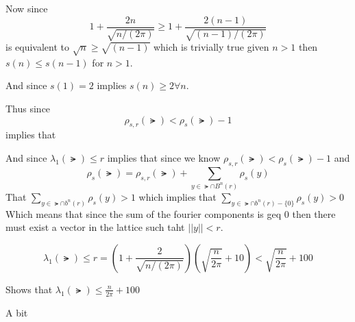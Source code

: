 \documentclass[12pt]{amsart}
\begin{document}
\begin{problem}
\begin{subproblem}
    Now since 
    \[1+\frac {2n}{\sqrt{n/(2\pi)}} \geq 1+\frac {2(n-1)}{\sqrt{(n-1)/(2\pi)}}\]
    is equivalent to $\sqrt n \geq \sqrt{(n-1)}$ which is trivially true given $n>1$ then $s(n) \leq s(n-1)$ for $n>1$.

    And since $s(1)=2$ implies $s(n)\geq 2\forall n$.


    Thus since 
    \[\rho_{s,r}(\lat) < \rho_s(\lat)-1\]
    implies that 

    And since $\lambda_1(\lat)\leq r$ implies that since we know 
    $\rho_{s,r}(\lat) < \rho_s(\lat)-1$ and 
    \[\rho_s(\lat) = \rho_{s,r}(\lat) + \sum_{y\in \lat \cap B^n(r)}\rho_s(y)\]
    That $\sum_{y\in \lat \cap b^n(r)}\rho_s(y) > 1$ which implies that $\sum_{y\in \lat \cap b^n(r)-\{0\}}\rho_s(y) > 0$
    Which means that since the sum of the fourier components is geq 0 then there must exist a vector in the lattice such taht $||y||<r$.

    \[\lambda_1(\lat) \leq r = (1+\frac2{\sqrt{n/(2\pi)}})(\sqrt{\frac{n}{2\pi}}+10) < \sqrt{\frac{n}{2\pi}}+100\]

    Shows that $\lambda_1(\lat)\leq \frac n {2\pi}+100$
  \end{subproblem}
  \end{problem}
  \begin{problem}
    A bit 
  \end{problem}
\end{document}
